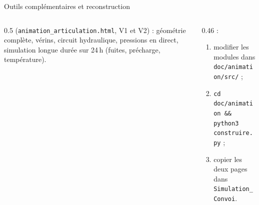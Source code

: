 \documentclass[aspectratio=169,9pt]{beamer}
\begin{document}
\begin{frame}{Outils complémentaires et reconstruction}
  \begin{columns}[T]
  \begin{column}{0.5\textwidth}
     (\texttt{animation\_articulation.html}, V1 et V2) : géométrie complète, vérins, circuit hydraulique, pressions en direct, simulation longue durée sur 24\,h (fuites, précharge, température).
  \end{column}
  \begin{column}{0.46\textwidth}
     :
    \begin{enumerate}
      \item modifier les modules dans \texttt{doc/animation/src/} ;
      \item \texttt{cd doc/animation \&\& python3 construire.py} ;
      \item copier les deux pages dans \texttt{Simulation\_Convoi}.
    \end{enumerate}
  \end{column}
  \end{columns}
\end{frame}
\end{document}
